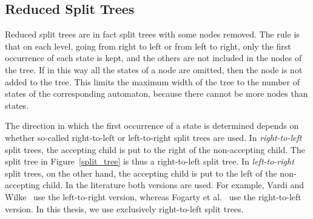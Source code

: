 






\subsection{Reduced Split Trees}
\label{2_red_split_trees}
Reduced split trees are in fact split trees with some nodes removed. The rule is that on each level, going from right to left or from left to right, only the first occurrence of each state is kept, and the others are not included in the nodes of the tree. If in this way all the states of a node are omitted, then the node is not added to the tree. This limits the maximum width of the tree to the number of states of the corresponding automaton, because there cannot be more nodes than states.

The direction in which the first occurrence of a state is determined depends on whether so-called right-to-left or left-to-right split trees are used. In \textit{right-to-left} split trees, the accepting child is put to the right of the non-accepting child. The split tree in Figure~\ref{split_tree} is thus a right-to-left split tree. In \textit{left-to-right} split trees, on the other hand, the accepting child is put to the left of the non-accepting child. In the literature both versions are used. For example, Vardi and Wilke~\cite{vardi2007automata} use the left-to-right version, whereas Fogarty et al.~\cite{fogarty2013unifying} use the right-to-left version. In this thesis, we use exclusively right-to-left split trees.

